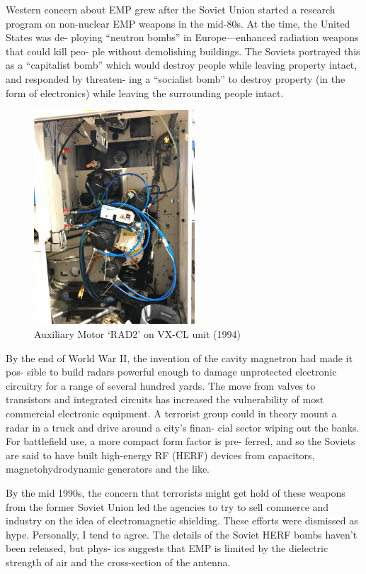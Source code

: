 \documentclass[10pt,journal,compsoc]{IEEEtran}
\begin{document}
Western concern about EMP grew after the Soviet Union started a research program
on non-nuclear EMP weapons in the mid-80s. At the time, the United States was de-
ploying “neutron bombs” in Europe—enhanced radiation weapons that could kill peo-
ple without demolishing buildings. The Soviets portrayed this as a “capitalist bomb”
which would destroy people while leaving property intact, and responded by threaten-
ing a “socialist bomb” to destroy property (in the form of electronics) while leaving the
surrounding people intact.

\begin{figure}%
    \centering
    \includegraphics[width=6cm]{bnw4607ouds51}
    \caption{Auxiliary Motor ‘RAD2’ on VX-CL unit (1994)}
    \label{fig:1}
\end{figure}

By the end of World War II, the invention of the cavity magnetron had made it pos-
sible to build radars powerful enough to damage unprotected electronic circuitry for a
range of several hundred yards. The move from valves to transistors and integrated
circuits has increased the vulnerability of most commercial electronic equipment. A
terrorist group could in theory mount a radar in a truck and drive around a city’s finan-
cial sector wiping out the banks. For battlefield use, a more compact form factor is pre-
ferred, and so the Soviets are said to have built high-energy RF (HERF) devices from
capacitors, magnetohydrodynamic generators and the like.

By the mid 1990s, the concern that terrorists might get hold of these weapons from
the former Soviet Union led the agencies to try to sell commerce and industry on the
idea of electromagnetic shielding. These efforts were dismissed as hype. Personally, I
tend to agree. The details of the Soviet HERF bombs haven’t been released, but phys-
ics suggests that EMP is limited by the dielectric strength of air and the cross-section
of the antenna.
\end{document}

